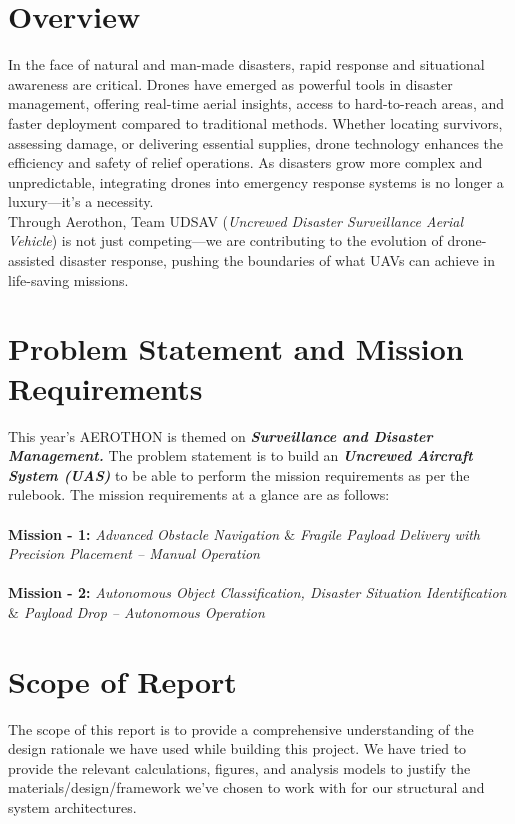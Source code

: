 \documentclass[12pt]{report}
\begin{document}
  \section{Overview}

   In the face of natural and man-made disasters, rapid response and situational awareness are critical. Drones have emerged as powerful tools in disaster management, offering real-time aerial insights, access to hard-to-reach areas, and faster deployment compared to traditional methods. Whether locating survivors, assessing damage, or delivering essential supplies, drone technology enhances the efficiency and safety of relief operations. As disasters grow more complex and unpredictable, integrating drones into emergency response systems is no longer a luxury—it's a necessity. \\ 

   Through Aerothon, Team UDSAV (\textit{Uncrewed Disaster Surveillance Aerial Vehicle}) is not just competing—we are contributing to the evolution of drone-assisted disaster response, pushing the boundaries of what UAVs can achieve in life-saving missions.

    \section{Problem Statement and Mission Requirements}
    This year's AEROTHON is themed on \textbf{\textit{Surveillance and Disaster Management.}} The problem statement is to build an \textbf{\textit{Uncrewed Aircraft System (UAS)}} to be able to perform the mission requirements as per the rulebook. The mission requirements at a glance are as follows: \\ \\
    \textbf{Mission - 1:} \textit{Advanced Obstacle Navigation $\&$ Fragile Payload Delivery with Precision Placement – Manual Operation} \\ \\
    \textbf{Mission - 2:} \textit{Autonomous Object Classification, Disaster Situation Identification $\&$ Payload Drop – Autonomous Operation} 



    \section{Scope of Report}
    The scope of this report is to provide a comprehensive understanding of the design rationale we have used while building this project. We have tried to provide the relevant calculations, figures, and analysis models to justify the materials/design/framework we've chosen to work with for our structural and system architectures. \\ 
\end{document}
